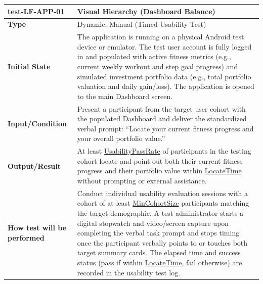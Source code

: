 \documentclass[12pt, titlepage]{article}
\newcommand{\const}[1]{\hyperlink{const:#1}{\textsf{#1}}}
\begin{document}
\vspace{1em}

\noindent\begin{tabularx}{\textwidth}{>{\raggedright\arraybackslash}p{3.5cm}X}
  \toprule
  \textbf{test-LF-APP-01}\label{test:LF-APP-01} & \textbf{Visual Hierarchy (Dashboard Balance)}\\
  \midrule
  \textbf{Type} & Dynamic, Manual (Timed Usability Test)\\
  \textbf{Initial State} & The application is running on a physical Android test device or emulator. The test user account is fully logged in and populated with active fitness metrics (e.g., current weekly workout and step goal progress) and simulated investment portfolio data (e.g., total portfolio valuation and daily gain/loss). The application is opened to the main Dashboard screen.\\
  \textbf{Input/Condition} & Present a participant from the target user cohort with the populated Dashboard and deliver the standardized verbal prompt: ``Locate your current fitness progress and your overall portfolio value.''\\
  \textbf{Output/Result} & At least \const{UsabilityPassRate} of participants in the testing cohort locate and point out both their current fitness progress and their portfolio value within \const{LocateTime} without prompting or external assistance.\\
  \textbf{How test will be performed} & Conduct individual usability evaluation sessions with a cohort of at least \const{MinCohortSize} participants matching the target demographic. A test administrator starts a digital stopwatch and video/screen capture upon completing the verbal task prompt and stops timing once the participant verbally points to or touches both target summary cards. The elapsed time and success status (pass if within \const{LocateTime}, fail otherwise) are recorded in the usability test log.\\
  \bottomrule
\end{tabularx}

\vspace{1em}
\end{document}
